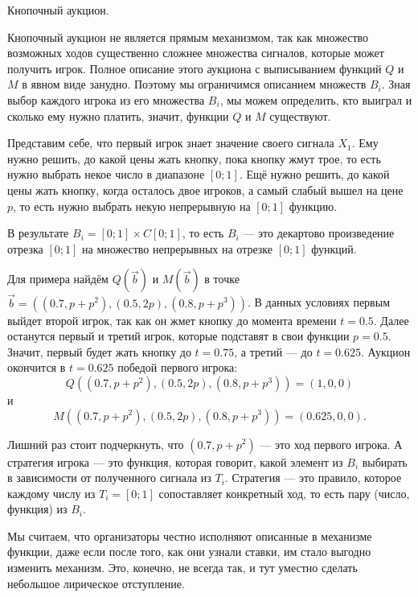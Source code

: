 \begin{myex} Кнопочный аукцион.

Кнопочный аукцион не является прямым механизмом, так как множество возможных ходов существенно сложнее множества сигналов, которые может получить игрок. Полное описание этого аукциона с выписыванием функций $ Q $ и $ M $ в явном виде  занудно. Поэтому мы ограничимся описанием множеств $ B_{i} $. Зная выбор каждого игрока из его множества $ B_{i}$, мы можем определить, кто выиграл и сколько ему нужно платить, значит, функции $ Q $ и $ M $ существуют.

Представим себе, что первый игрок знает значение  своего сигнала $ X_{1} $. Ему нужно решить, до какой цены жать кнопку, пока кнопку жмут трое, то есть нужно выбрать некое число в диапазоне $ [0;1] $. Ещё нужно решить, до какой цены жать кнопку, когда осталось двое игроков, а самый слабый вышел на цене $ p $, то есть нужно выбрать некую непрерывную на $ [0;1] $ функцию.

В результате $ B_{i}=[0;1]\times C[0;1] $, то есть $ B_{i} $ — это декартово произведение отрезка $ [0;1] $ на множество непрерывных на отрезке $ [0;1] $ функций.

Для примера найдём $ Q(\vec{b})$ и $ M(\vec{b}) $ в точке  $\vec{b}=((0.7,p+p^{2}),(0.5,2p),(0.8,p+p^{3})) $. В данных условиях первым выйдет второй игрок, так как он жмет кнопку до момента времени $ t=0.5 $. Далее останутся первый и третий игрок, которые подставят в свои функции $ p=0.5 $. Значит, первый будет жать кнопку до $ t=0.75 $, а третий — до $ t=0.625 $. Аукцион окончится в $ t=0.625 $ победой первого игрока:
\begin{equation}
Q((0.7,p+p^{2}),(0.5,2p),(0.8,p+p^{3}))=(1,0,0)
\end{equation}
и
\begin{equation}
M((0.7,p+p^{2}),(0.5,2p),(0.8,p+p^{3}))=(0.625,0,0).
\end{equation}

Лишний раз стоит подчеркнуть, что $ (0.7,p+p^{2}) $ — это ход первого игрока. А стратегия игрока — это функция, которая говорит, какой элемент из $ B_{i} $ выбирать в зависимости от полученного сигнала из $ T_{i} $. Стратегия — это правило, которое каждому числу из $ T_{i}=[0;1] $ сопоставляет конкретный ход, то есть пару (число, функция) из $ B_{i} $.

\end{myex}

Мы считаем, что организаторы честно исполняют описанные в механизме функции, даже если после того, как они узнали ставки, им стало выгодно изменить механизм. Это, конечно, не всегда так, и тут уместно сделать небольшое лирическое отступление.

